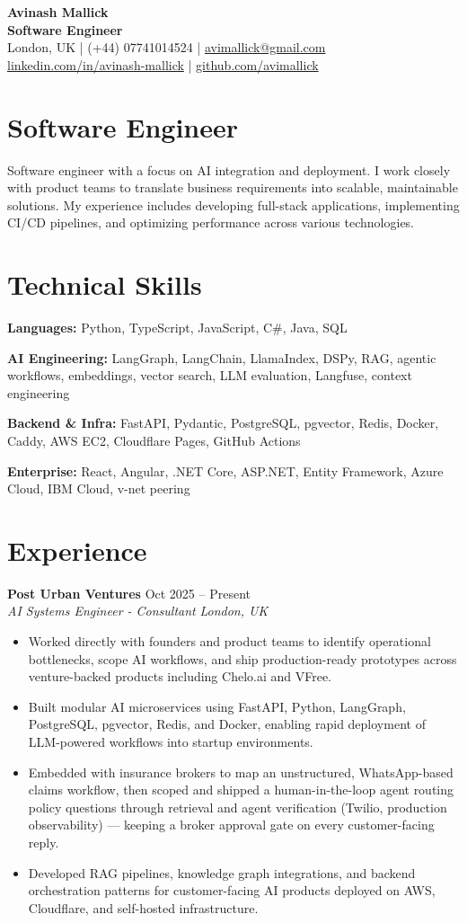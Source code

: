\documentclass[10pt,letterpaper]{article}
\newcommand{\resumeHeader}[6]{
  \begin{center}
    {\fontsize{22}{24}\selectfont\bfseries\color{ink} #1}\\[-1pt]
    {\normalsize\bfseries\color{accent} Software Engineer}\\[4pt]
    {\small\color{muted} #2 \quad | \quad #3 \quad | \quad \href{mailto:#4}{#4}}\\[-1pt]
    {\small\color{muted} \href{#5}{linkedin.com/in/avinash-mallick} \quad | \quad \href{#6}{github.com/avimallick}}
  \end{center}
  \vspace{-4pt}
}
\newcommand{\role}[4]{
  \vspace{2pt}
  {\bfseries\color{ink} #1} \hfill {\small\color{muted} #2}\\
  {\itshape\color{muted} #3} \hfill {\small\itshape\color{muted} #4}
}
\newcommand{\summary}[1]{
  \begingroup
  \color{ink}
  \linespread{1.03}\selectfont
  #1
  \endgroup
}
\newcommand{\skillrow}[2]{
  \begingroup
  \raggedright
  {\bfseries\color{ink}#1:} #2\par\vspace{2pt}
  \endgroup
}
\begin{document}
\resumeHeader
  {Avinash Mallick}
  {London, UK}
  {(+44) 07741014524}
  {avimallick@gmail.com}
  {https://www.linkedin.com/in/avinash-mallick-b272b6214/}
  {https://github.com/avimallick}

\section*{Software Engineer}
\summary{Software engineer with a focus on AI integration and deployment. I work closely with product teams to translate business requirements into scalable, maintainable solutions. My experience includes developing full-stack applications, implementing CI/CD pipelines, and optimizing performance across various technologies.}

\section*{Technical Skills}
\skillrow{Languages}{Python, TypeScript, JavaScript, C\#, Java, SQL}
\skillrow{AI Engineering}{LangGraph, LangChain, LlamaIndex, DSPy, RAG, agentic workflows, embeddings, vector search, LLM evaluation, Langfuse, context engineering}
\skillrow{Backend \& Infra}{FastAPI, Pydantic, PostgreSQL, pgvector, Redis, Docker, Caddy, AWS EC2, Cloudflare Pages, GitHub Actions}
\skillrow{Enterprise}{React, Angular, .NET Core, ASP.NET, Entity Framework, Azure Cloud, IBM Cloud, v-net peering}

\section*{Experience}
\role{Post Urban Ventures}{Oct 2025 -- Present}{AI Systems Engineer - Consultant}{London, UK}
\begin{itemize}
  \item Worked directly with founders and product teams to identify operational bottlenecks, scope AI workflows, and ship production-ready prototypes across venture-backed products including Chelo.ai and VFree.
  \item Built modular AI microservices using FastAPI, Python, LangGraph, PostgreSQL, pgvector, Redis, and Docker, enabling rapid deployment of LLM-powered workflows into startup environments.
  \item Embedded with insurance brokers to map an unstructured, WhatsApp-based claims workflow, then scoped and shipped a human-in-the-loop agent routing policy questions through retrieval and agent verification (Twilio, production observability) --- keeping a broker approval gate on every customer-facing reply.
  \item Developed RAG pipelines, knowledge graph integrations, and backend orchestration patterns for customer-facing AI products deployed on AWS, Cloudflare, and self-hosted infrastructure.
\end{itemize}
\end{document}
